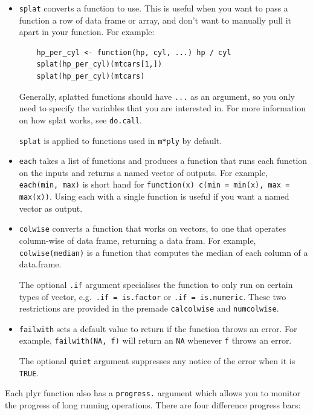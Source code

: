 \documentclass{scrartcl}
\begin{document}
\begin{itemize}
  \item {\tt splat} converts a function to use.  This is useful when you want to pass a function a row of data frame or array, and don't want to manually pull it apart in your function.  For example:
  
  \begin{verbatim}
    hp_per_cyl <- function(hp, cyl, ...) hp / cyl
    splat(hp_per_cyl)(mtcars[1,])
    splat(hp_per_cyl)(mtcars)
  \end{verbatim} 
  
  Generally, splatted functions should have {\tt ...} as an argument, so you only need to specify the variables that you are interested in.  For more information on how splat works, see {\tt do.call}.  
  
  {\tt splat} is applied to functions used in {\tt m*ply} by default.

  \item {\tt each} takes a list of functions and produces a function that runs  each function on the inputs and returns a named vector of outputs.   For example, {\tt each(min, max)} is short hand for {\tt function(x) c(min = min(x), max = max(x))}.  Using each with a single function is useful if you want a named vector as output.

  \item {\tt colwise} converts a function that works on vectors, to one that operates column-wise of data frame, returning a data fram.  For example, {\tt colwise(median)} is a function that computes the median of each column of a data.frame.  
  
  The optional {\tt .if} argument specialises the function to only run on certain types of vector, e.g.\ {\tt .if = is.factor} or {\tt .if = is.numeric}.  These two restrictions are provided in the premade {\tt calcolwise} and {\tt numcolwise}.  
  
  \item {\tt failwith} sets a default value to return if the function throws an error.  For example, {\tt failwith(NA, f)} will return an {\tt NA} whenever {\tt f} throws an error.  
  
  The optional {\tt quiet} argument suppresses any notice of the error when it is {\tt TRUE}.

\end{itemize}

Each plyr function also has a {\tt progress.} argument which allows you to monitor the progress of long running operations.  There are four difference progress bars:
\end{document}
